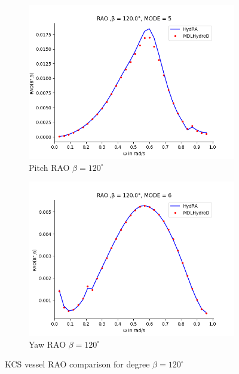 \begin{figure}[H]
\begin{subfigure}[b]{0.45\textwidth}
        \includegraphics[width=\textwidth]{plots/kcs/rao/rao5.png}
        \caption{Pitch RAO $\beta = 120^{\circ}$}
    \end{subfigure}
    \begin{subfigure}[b]{0.45\textwidth}
        \includegraphics[width=\textwidth]{plots/kcs/rao/rao6.png}
        \caption{Yaw RAO $\beta = 120^{\circ}$}
    \end{subfigure}
    \caption{KCS vessel RAO comparison for degree $\beta= 120^{\circ}$}
    \label{fig:kcs_rao_120}
\end{figure}
\newpage
